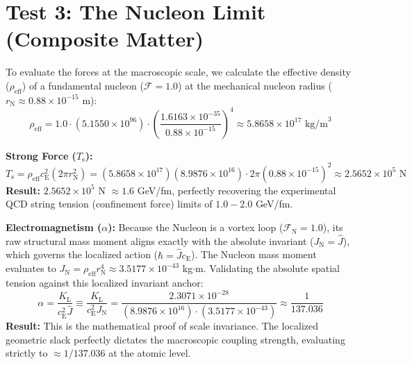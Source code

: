 \section{Test 3: The Nucleon Limit (Composite Matter)}
To evaluate the forces at the macroscopic scale, we calculate the effective density ($\rho_{\mathrm{eff}}$) of a fundamental nucleon ($\mathcal{F}=1.0$) at the mechanical nucleon radius ($r_{\mathrm{N}} \approx 0.88 \times 10^{-15}$ m):
\begin{equation}
    \rho_{\mathrm{eff}} = 1.0 \cdot (5.1550 \times 10^{96}) \cdot \left(\frac{1.6163 \times 10^{-35}}{0.88 \times 10^{-15}}\right)^4 \approx 5.8658 \times 10^{17} \text{ kg/m}^3
\end{equation}

\vspace{0.2em}
\noindent \textbf{Strong Force ($T_{\mathrm{s}}$):}
\begin{equation}
    T_{\mathrm{s}} = \rho_{\mathrm{eff}} c_{\mathrm{E}}^2 (2\pi r_{\mathrm{N}}^2) = (5.8658 \times 10^{17})(8.9876 \times 10^{16}) \cdot 2\pi (0.88 \times 10^{-15})^2 \approx 2.5652 \times 10^5 \text{ N}
\end{equation}
\noindent \textbf{Result:} $2.5652 \times 10^5$ N $\approx 1.6$ GeV/fm, perfectly recovering the experimental QCD string tension (confinement force) limits of $1.0 - 2.0$ GeV/fm.

\vspace{0.2em}
\noindent \textbf{Electromagnetism ($\alpha$):} Because the Nucleon is a vortex loop ($\mathcal{F}_{\mathrm{N}} = 1.0$), its raw structural mass moment aligns exactly with the absolute invariant ($J_{\mathrm{N}} = \hat{J}$), which governs the localized action ($\hbar = \hat{J} c_{\mathrm{E}}$). The Nucleon mass moment evaluates to $J_{\mathrm{N}} = \rho_{\mathrm{eff}} r_{\mathrm{N}}^4 \approx 3.5177 \times 10^{-43}$ kg$\cdot$m. Validating the absolute spatial tension against this localized invariant anchor:
\begin{equation}
    \alpha = \frac{K_{\mathrm{L}}}{c_{\mathrm{E}}^2 \hat{J}} \equiv \frac{K_{\mathrm{L}}}{c_{\mathrm{E}}^2 J_{\mathrm{N}}} = \frac{2.3071 \times 10^{-28}}{(8.9876 \times 10^{16}) \cdot (3.5177 \times 10^{-43})} \approx \frac{1}{137.036}
\end{equation}
\noindent \textbf{Result:} This is the mathematical proof of scale invariance. The localized geometric slack perfectly dictates the macroscopic coupling strength, evaluating strictly to $\approx 1/137.036$ at the atomic level.

